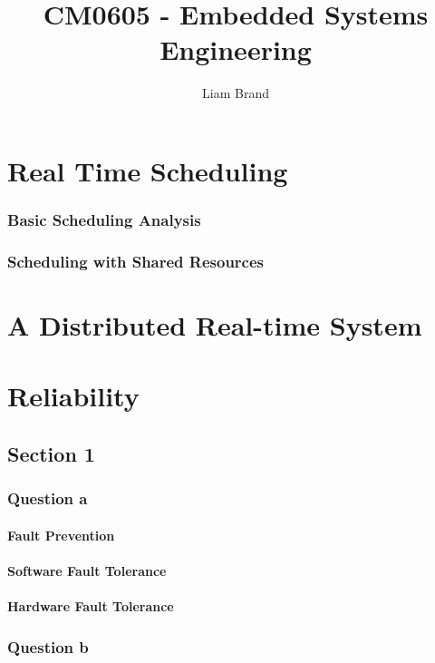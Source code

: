 \documentclass[]{report}
\title{CM0605 - Embedded Systems Engineering}
\author{Liam Brand}
\date{}
\begin{document}
\maketitle

	\chapter{Real Time Scheduling}
		\subsection{Basic Scheduling Analysis}
		
		\subsection{Scheduling with Shared Resources}
	
	
	\chapter{A Distributed Real-time System}
	
	
	
	\chapter{Reliability}
		\section{Section 1}
			\subsection{Question a}
				\subsubsection{Fault Prevention}
				\subsubsection{Software Fault Tolerance}
				\subsubsection{Hardware Fault Tolerance}
				
				
				
			
			\subsection{Question b}
\end{document}
